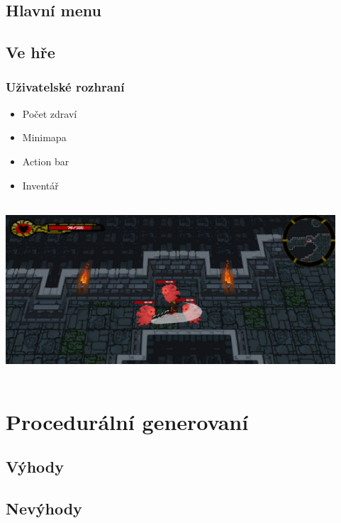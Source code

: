 \documentclass{beamer}
\begin{document}
	\subsection{Hlavní menu}	
	\subsection{Ve hře}	
	
\begin{frame}
	\frametitle{Uživatelské rozhraní}
	
	\begin{multicols}{4}
  		\begin{itemize}
 			\item Počet zdraví
			\item Minimapa
 			\item Action bar
 			\item Inventář
		\end{itemize}
	\end{multicols}
	
	\includegraphics[width=12.3cm, height = 6.5cm]{UI-game.png}	
		
\end{frame}


\section{Procedurální generovaní}

\subsection{Výhody}
\subsection{Nevýhody}
	
\end{document}
